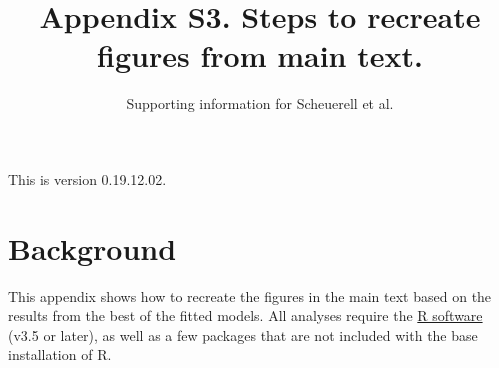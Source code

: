 \documentclass[11pt,]{article}
\title{Appendix S3. Steps to recreate figures from main text.}
\subtitle{Supporting information for Scheuerell et al.}
\author{}
\date{}
\begin{document}
\maketitle

{
\setcounter{tocdepth}{2}
\tableofcontents
}
\vspace{0.2in}

This is version 0.19.12.02.

\section{Background}\label{background}

This appendix shows how to recreate the figures in the main text based
on the results from the best of the fitted models. All analyses require
the \href{https://cran.r-project.org/}{R software} (v3.5 or later), as
well as a few packages that are not included with the base installation
of R.
\end{document}
